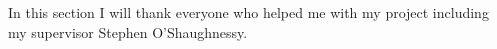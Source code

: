 \def\baselinestretch{1.0}


In this section I will thank everyone who helped me with my project including my supervisor Stephen O'Shaughnessy.
